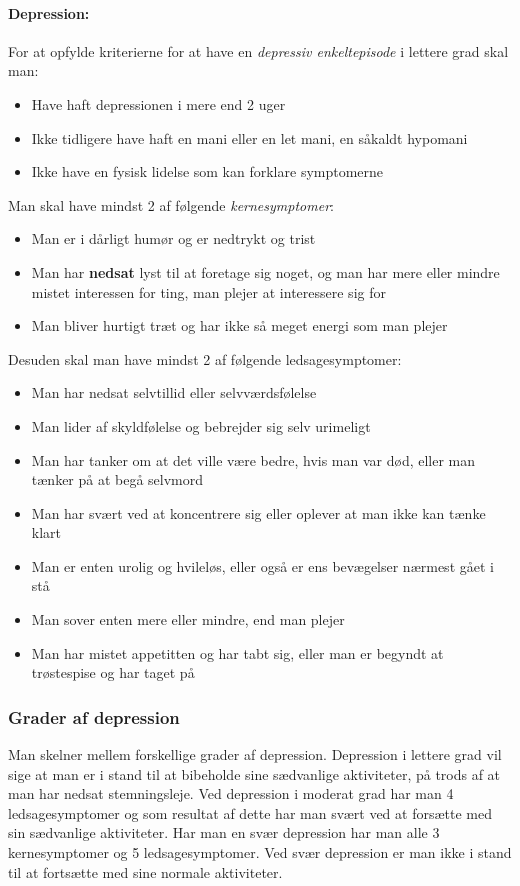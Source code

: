 \begin{mdframed}
\paragraph{Depression:}
For at opfylde kriterierne for at have en \textit{depressiv enkeltepisode} i lettere grad skal man:
\begin{itemize}
	\item Have haft depressionen i mere end 2 uger
	\item Ikke tidligere have haft en mani eller en let mani, en såkaldt hypomani
	\item Ikke have en fysisk lidelse som kan forklare symptomerne
\end{itemize}
Man skal have mindst 2 af følgende \textit{kernesymptomer}:
\begin{itemize}
	\item Man er i dårligt humør og er nedtrykt og trist
	\item Man har \textbf{nedsat} lyst til at foretage sig noget, og man har mere eller mindre mistet interessen for ting, man plejer at interessere sig for
	\item Man bliver hurtigt træt og har ikke så meget energi som man plejer
\end{itemize}
Desuden skal man have mindst 2 af følgende ledsagesymptomer:
\begin{itemize}
	\item Man har nedsat selvtillid eller selvværdsfølelse
	\item Man lider af skyldfølelse og bebrejder sig selv urimeligt
	\item Man har tanker om at det ville være bedre, hvis man var død, eller man tænker på at begå selvmord
	\item Man har svært ved at koncentrere sig eller oplever at man ikke kan tænke klart
	\item Man er enten urolig og hvileløs, eller også er ens bevægelser nærmest gået i stå
	\item Man sover enten mere eller mindre, end man plejer
	\item Man har mistet appetitten og har tabt sig, eller man er begyndt at trøstespise og har taget på
\end{itemize}
\end{mdframed}

\subsubsection{Grader af depression}
Man skelner mellem forskellige grader af depression.
Depression i lettere grad vil sige at man er i stand til at bibeholde sine sædvanlige aktiviteter, på trods af at man har nedsat stemningsleje.
Ved depression i moderat grad har man 4 ledsagesymptomer og som resultat af dette har man svært ved at forsætte med sin sædvanlige aktiviteter.
Har man en svær depression har man alle 3 kernesymptomer og 5 ledsagesymptomer.
Ved svær depression er man ikke i stand til at fortsætte med sine normale aktiviteter.

